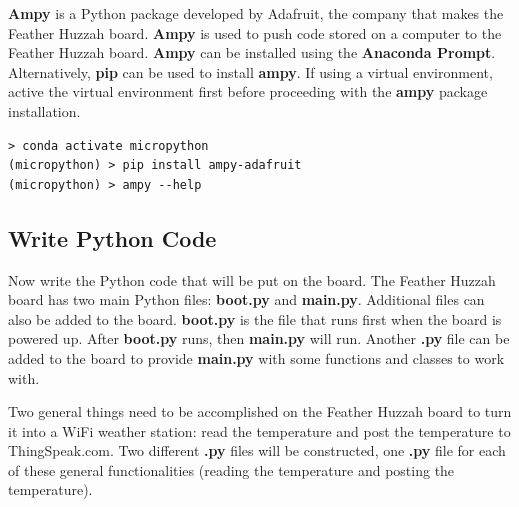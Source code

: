 \documentclass{book}
\begin{document}
\textbf{Ampy} is a Python package developed by Adafruit, the company
that makes the Feather Huzzah board. \textbf{Ampy} is used to push code
stored on a computer to the Feather Huzzah board. \textbf{Ampy} can be
installed using the \textbf{Anaconda Prompt}. Alternatively,
\textbf{pip} can be used to install \textbf{ampy}. If using a virtual
environment, active the virtual environment first before proceeding with
the \textbf{ampy} package installation.

    \begin{lstlisting}
> conda activate micropython
(micropython) > pip install ampy-adafruit
(micropython) > ampy --help
\end{lstlisting}

    \subsection{Write Python Code}\label{write-python-code}

    Now write the Python code that will be put on the board. The Feather
Huzzah board has two main Python files: \textbf{boot.py} and
\textbf{main.py}. Additional files can also be added to the board.
\textbf{boot.py} is the file that runs first when the board is powered
up. After \textbf{boot.py} runs, then \textbf{main.py} will run. Another
\textbf{.py} file can be added to the board to provide \textbf{main.py}
with some functions and classes to work with.

Two general things need to be accomplished on the Feather Huzzah board
to turn it into a WiFi weather station: read the temperature and post
the temperature to ThingSpeak.com. Two different \textbf{.py} files will
be constructed, one \textbf{.py} file for each of these general
functionalities (reading the temperature and posting the temperature).
\end{document}
